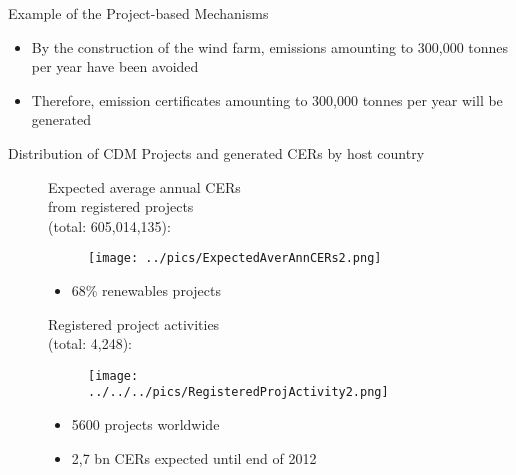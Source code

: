 
{Example of the Project-based Mechanisms}
\begin{itemize}
\item<1-> By the construction of the wind farm, emissions amounting to 300,000 tonnes per year have been avoided
\item<2-> Therefore, emission certificates amounting to 300,000 tonnes per year will be generated
\end{itemize}


{Distribution of CDM Projects and generated CERs by host country }
\begin{figure}[t]
\begin{minipage}[t]{0.475\textwidth}
Expected average annual CERs \\
from registered projects \\
(total: 605,014,135):
\vspace*{-0.7cm}
\begin{figure}
\centering
\texttt{[image: ../pics/ExpectedAverAnnCERs2.png]}
\end{figure}
\vspace*{-0.8cm}
\begin{itemize}
\item<1-> 68\% renewables projects %
\end{itemize}
\vspace*{-0.9cm}

\end{minipage}
\begin{minipage}[t]{0.475\textwidth}
Registered project activities\\
(total: 4,248):
\vspace*{-0.7cm}
\begin{figure}
\centering
\texttt{[image: ../../../pics/RegisteredProjActivity2.png]}
\end{figure}
\vspace*{-0.8cm}
\begin{itemize}
\item<1-> 5600  projects worldwide
\item<2-> 2,7 bn CERs expected until end of 2012
\end{itemize}
\end{minipage}
\end{figure}


